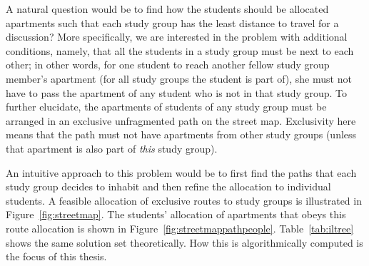 A natural question would be to find how the students should be
allocated apartments such that each study group has the least distance
to travel for a discussion? More specifically, we are interested in
the problem with additional conditions, namely, that all the students
in a study group must be next to each other; in other words, for one
student to reach another fellow study group member's apartment (for
all study groups the student is part of), she must not have to pass
the apartment of any student who is not in that study group. To
further elucidate, the apartments of students of any study group must
be arranged in an exclusive unfragmented path on the street
map. Exclusivity here means that the path must not have apartments
from other study groups (unless that apartment is also part of {\em
  this} study group).

An intuitive approach to this problem would be to first find the paths
that each study group decides to inhabit and then refine the
allocation to individual students. A feasible allocation of exclusive
routes to study groups is illustrated in Figure~\ref{fig:streetmap}.  The
students' allocation of apartments that obeys this route allocation is
shown in Figure~\ref{fig:streetmappathpeople}. Table~\ref{tab:iltree}
shows the same solution set theoretically.  How this is
algorithmically computed is the focus of this thesis.



